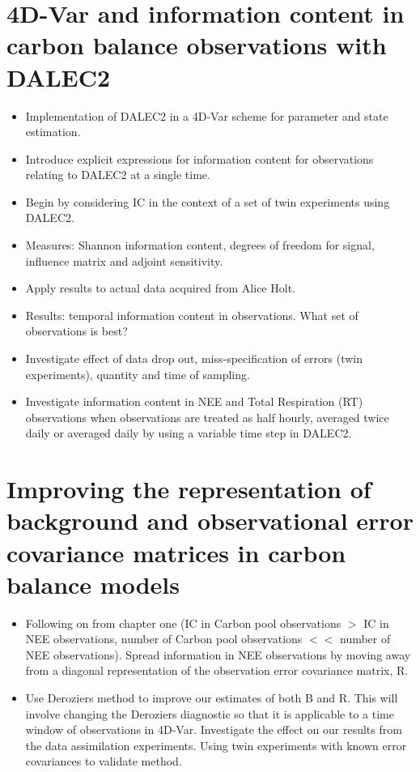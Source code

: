 \documentclass[11pt]{article}
\begin{document}
\section{4D-Var and information content in carbon balance observations with DALEC2}
\begin{itemize}
\item Implementation of DALEC2 in a 4D-Var scheme for parameter and state estimation. 
\item Introduce explicit expressions for information content for observations relating to DALEC2 at a single time.
\item Begin by considering IC in the context of a set of twin experiments using DALEC2.
\item Measures: Shannon information content, degrees of freedom for signal, influence matrix and adjoint sensitivity.
\item Apply results to actual data acquired from Alice Holt.
\item Results: temporal information content in observations. What set of observations is best?
\item Investigate effect of data drop out, miss-specification of errors (twin experiments), quantity and time of sampling.
\item Investigate information content in NEE and Total Respiration (RT) observations when observations are treated as half hourly, averaged twice daily or averaged daily by using a variable time step in DALEC2.   
\end{itemize}


\section{Improving the representation of background and observational error covariance matrices in carbon balance models} 
\begin{itemize}
\item Following on from chapter one (IC in Carbon pool observations $>$ IC in NEE observations, number of Carbon pool observations $<<$ number of NEE observations). Spread information in NEE observations by moving away from a diagonal representation of the observation error covariance matrix, R.
\item Use Deroziers method to improve our estimates of both B and R. This will involve changing the Deroziers diagnostic so that it is applicable to a time window of observations in 4D-Var. Investigate the effect on our results from the data assimilation experiments. Using twin experiments with known error covariances to validate method.
\end{itemize}
\end{document}
